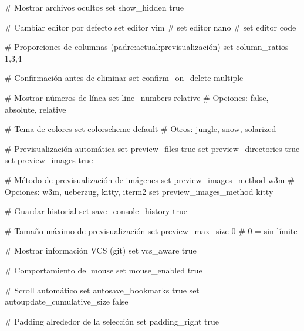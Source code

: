 \documentclass[
  doc,
  floatsintext,
  longtable,
  a4paper,
  nolmodern,
  notxfonts,
  notimes,
  12pt,
  colorlinks=true,linkcolor=blue,citecolor=blue,urlcolor=blue]{apa7}
\newenvironment{Shaded}{\begin{snugshade}}{\end{snugshade}}
\newcommand{\BuiltInTok}[1]{\textcolor[rgb]{0.00,0.23,0.31}{#1}}
\newcommand{\CommentTok}[1]{\textcolor[rgb]{0.37,0.37,0.37}{#1}}
\newcommand{\NormalTok}[1]{\textcolor[rgb]{0.00,0.23,0.31}{#1}}
\begin{document}
\begin{Shaded}
\begin{Highlighting}[]
\CommentTok{\# Mostrar archivos ocultos}
\BuiltInTok{set}\NormalTok{ show\_hidden true}

\CommentTok{\# Cambiar editor por defecto}
\BuiltInTok{set}\NormalTok{ editor vim}
\CommentTok{\# set editor nano}
\CommentTok{\# set editor code}

\CommentTok{\# Proporciones de columnas (padre:actual:previsualización)}
\BuiltInTok{set}\NormalTok{ column\_ratios 1,3,4}

\CommentTok{\# Confirmación antes de eliminar}
\BuiltInTok{set}\NormalTok{ confirm\_on\_delete multiple}

\CommentTok{\# Mostrar números de línea}
\BuiltInTok{set}\NormalTok{ line\_numbers relative}
\CommentTok{\# Opciones: false, absolute, relative}

\CommentTok{\# Tema de colores}
\BuiltInTok{set}\NormalTok{ colorscheme default}
\CommentTok{\# Otros: jungle, snow, solarized}

\CommentTok{\# Previsualización automática}
\BuiltInTok{set}\NormalTok{ preview\_files true}
\BuiltInTok{set}\NormalTok{ preview\_directories true}
\BuiltInTok{set}\NormalTok{ preview\_images true}

\CommentTok{\# Método de previsualización de imágenes}
\BuiltInTok{set}\NormalTok{ preview\_images\_method w3m}
\CommentTok{\# Opciones: w3m, ueberzug, kitty, iterm2}
\BuiltInTok{set}\NormalTok{ preview\_images\_method kitty}

\CommentTok{\# Guardar historial}
\BuiltInTok{set}\NormalTok{ save\_console\_history true}

\CommentTok{\# Tamaño máximo de previsualización}
\BuiltInTok{set}\NormalTok{ preview\_max\_size 0  }\CommentTok{\# 0 = sin límite}

\CommentTok{\# Mostrar información VCS (git)}
\BuiltInTok{set}\NormalTok{ vcs\_aware true}

\CommentTok{\# Comportamiento del mouse}
\BuiltInTok{set}\NormalTok{ mouse\_enabled true}

\CommentTok{\# Scroll automático}
\BuiltInTok{set}\NormalTok{ autosave\_bookmarks true}
\BuiltInTok{set}\NormalTok{ autoupdate\_cumulative\_size false}

\CommentTok{\# Padding alrededor de la selección}
\BuiltInTok{set}\NormalTok{ padding\_right true}
\end{Highlighting}
\end{Shaded}
\end{document}
